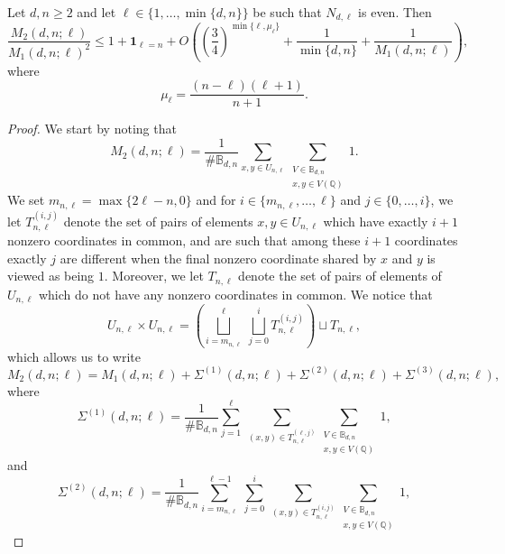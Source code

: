 \documentclass[10pt,a4paper]{amsart}
\renewcommand{\geq}{\geqslant}
\renewcommand{\leq}{\leqslant}
\begin{document}
\begin{lemma}
\label{Lemma second moment}
Let $d, n \geq 2$ and let $\ell \in \{1, \dots, \min\{d,n\}\}$ be such that $N_{d,\ell}$ is even. Then 
\begin{equation*}
\frac{M_2(d,n;\ell)}{M_1(d,n;\ell)^2} \leq 
1 + \boldsymbol{1}_{\ell=n} + O \left( \left(\frac{3}{4}\right)^{\min\{\ell,\mu_\ell\}}+\frac1{\min\{d,n\}}+
 \frac1{M_1(d,n;\ell)}\right) ,
\end{equation*}
where
\begin{equation}\label{eq:soil}
\mu_\ell=\frac{(n-\ell)(\ell+1)}{n+1}.
\end{equation}
\end{lemma}

\begin{proof}
We start by noting that
\begin{equation*}
M_2(d,n;\ell) = \frac1{\# \mathbb{B}_{d,n}} \sum_{x, y \in U_{n,\ell}} \sum_{\substack{V \in \mathbb{B}_{d,n} \\ x, y \in V(\mathbb{Q})}} 1.
\end{equation*}
We set $m_{n,\ell} = \max\{2\ell-n,0\}$ and for $i \in \{m_{n,\ell}, \dots, \ell\}$ and $j \in \{0, \dots, i\}$, we let $T_{n,\ell}^{(i,j)}$ denote the set of pairs of elements $x, y \in U_{n,\ell}$ which have exactly $i+1$ nonzero coordinates in common, and are such that among these $i+1$ coordinates exactly $j$ are different when the final nonzero coordinate shared by $x$ and $y$ is viewed as being $1$. Moreover, we let $T_{n,\ell}$ denote the set of pairs of elements of $ U_{n,\ell}$ which do not have any nonzero coordinates in common. We notice that
\begin{equation*}
U_{n,\ell} \times U_{n,\ell} = \left( \bigsqcup_{i=m_{n,\ell}}^{\ell} \ \bigsqcup_{j=0}^i T_{n,\ell}^{(i,j)} \right) \sqcup T_{n,\ell},
\end{equation*}
which allows us to write
\begin{equation}
\label{Equality M2}
M_2(d,n;\ell) = M_1(d,n;\ell) + \Sigma^{(1)}(d,n;\ell)+\Sigma^{(2)}(d,n;\ell)+\Sigma^{(3)}(d,n;\ell),
\end{equation}
where
\begin{equation*}
\Sigma^{(1)}(d,n;\ell) = \frac1{\# \mathbb{B}_{d,n}} \sum_{j=1}^{\ell} \ \sum_{(x, y) \in T_{n,\ell}^{(\ell,j)}} \sum_{\substack{V \in \mathbb{B}_{d,n} \\ x, y \in V(\mathbb{Q})}} 1,
\end{equation*}
and
\begin{equation*}
\Sigma^{(2)}(d,n;\ell) = \frac1{\# \mathbb{B}_{d,n}} \sum_{i=m_{n,\ell}}^{\ell-1} \ \sum_{j=0}^i \ \sum_{(x, y) \in T_{n,\ell}^{(i,j)}} \sum_{\substack{V \in \mathbb{B}_{d,n} \\ x, y \in V(\mathbb{Q})}} 1,

\end{equation*}
\end{proof}
\end{document}
